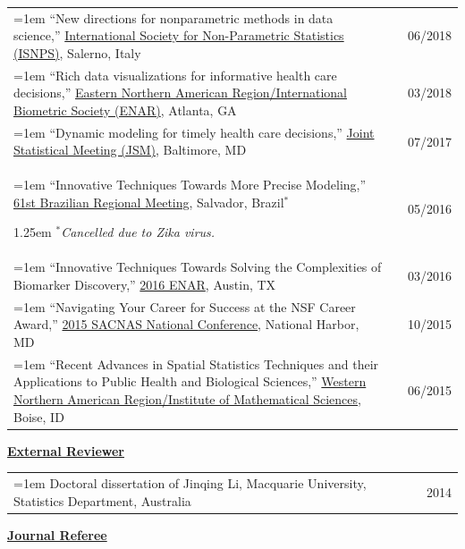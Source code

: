 \documentclass[12pt]{article}
\newcommand{\removespace}{\vspace{-2.5ex}}
\def\bam{\begin{addmargin}[1em]{1.25em}}
\def\eam{\end{addmargin}}
\def\ben{\newline\bam\removespace}
\def\een{\removespace\eam}
\def\myhang{\hangindent=1em
\hangafter=1}
\def\myhangn{\hangindent=1em
\hangafter=0}
\begin{document}
\vskip 0.1in
\renewcommand{\arraystretch}{1.1}%
\begin{longtable}{p{12cm} p{0cm} l}

%
\myhang ``New directions for nonparametric methods in data science,'' \href{http://fields.dm.unipi.it/pipermail/random/2017/001434.html}{{International Society for Non-Parametric Statistics
 (ISNPS)}}, Salerno, Italy
  && 06/2018\\

%
\myhang ``Rich data visualizations for informative health care decisions,'' \href{ www.enar.org}{{Eastern Northern American Region/International Biometric Society (ENAR)}}, Atlanta, GA
  && 03/2018\\
 
 \myhang ``Dynamic modeling for timely health care decisions,'' \href{https://ww2.amstat.org/meetings/jsm/2017/}{Joint Statistical Meeting (JSM)}, Baltimore, MD & & 07/2017\\

%
\myhang  ``Innovative Techniques Towards More Precise Modeling,'' \href{ www.RBras2016.org}{{61st Brazilian Regional Meeting}}, Salvador, Brazil$^*$
\ben
 $^*$\emph{Cancelled due to Zika virus.}
\een
  && 05/2016\\

%
%
\myhang ``Innovative Techniques Towards Solving the Complexities of Biomarker Discovery,'' \href{http://www.enar.org}{{2016 ENAR}}, Austin, TX && 03/2016\\
%
%
\myhang ``Navigating Your
Career for Success at the NSF Career Award,'' \href{http://www.2015sacnas.org }{{2015 SACNAS National Conference}}, National Harbor, MD && 10/2015\\
%
%
\myhang ``Recent Advances in Spatial Statistics Techniques and their Applications to Public
Health and Biological Sciences,'' \href{http://math.boisestate.edu/wnar2015/}{{Western Northern American Region/Institute of Mathematical Sciences}}, Boise, ID && 06/2015\\
\end{longtable}
%
%
\vskip 0.2in
\underline{{\bf External Reviewer}}
\renewcommand{\arraystretch}{1.1}%
\begin{longtable}{p{12cm} p{0cm} l}
\myhangn Doctoral dissertation of Jinqing Li,  Macquarie University, Statistics Department, %
Australia &&2014\\
\end{longtable}
%
\vskip 0.2in
\underline{{\bf Journal Referee}}
\end{document}
